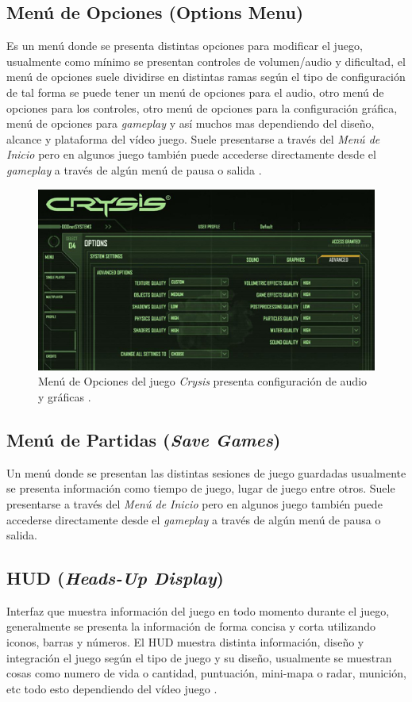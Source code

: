 \subsection{Menú de Opciones (Options Menu)}
Es un menú donde se presenta distintas opciones para modificar el juego, usualmente como mínimo se presentan controles de volumen/audio y dificultad, el menú de opciones suele dividirse en distintas ramas según el tipo de configuración de tal forma se puede tener un menú de opciones para el audio, otro menú de opciones para los controles, otro menú de opciones para la configuración gráfica, menú de opciones para \emph{gameplay} y así muchos mas dependiendo del diseño, alcance y plataforma del vídeo juego. Suele presentarse a través del \emph{Menú de Inicio} pero en algunos juego también puede accederse directamente desde el \emph{gameplay} a través de algún menú de pausa o salida \cite{gb_optionsmenu}.~\\

\begin{figure}[H]
\centering
\includegraphics[width=0.95\linewidth]{media/crysis_opmenu.jpg} 
\caption{Menú de Opciones del juego \emph{Crysis} presenta configuración de audio y gráficas \cite{crysis}.}
\end{figure}

\subsection{Menú de Partidas (\emph{Save Games})}
Un menú donde se presentan las distintas sesiones de juego guardadas usualmente se presenta información como tiempo de juego, lugar de juego entre otros. Suele presentarse a través del \emph{Menú de Inicio} pero en algunos juego también puede accederse directamente desde el \emph{gameplay} a través de algún menú de pausa o salida.

\subsection{HUD (\emph{Heads-Up Display})}
Interfaz que muestra información del juego en todo momento durante el juego, generalmente se presenta la información de forma concisa y corta utilizando iconos, barras y números. El HUD muestra distinta información, diseño y integración el juego según el tipo de juego y su diseño, usualmente se muestran cosas como numero de vida o cantidad, puntuación, mini-mapa o radar, munición, etc todo esto dependiendo del vídeo juego \cite{huds}.~\\

